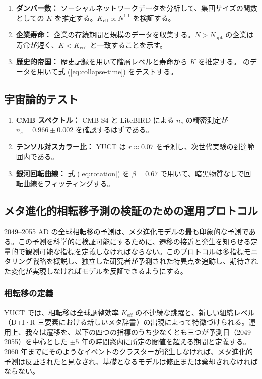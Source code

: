 \documentclass[12pt,a4paper]{article}
\newcommand{\Keff}{K_{\mathrm{eff}}}
\theoremstyle{remark}
\begin{document}
	\begin{enumerate}
		\item \textbf{ダンバー数：} ソーシャルネットワークデータを分析して、集団サイズの関数としての \(K\) を推定する。\(\Keff \propto N^{1.1}\) を検証する。
		\item \textbf{企業寿命：} 企業の存続期間と規模のデータを収集する。\(N > N_{\text{opt}}\) の企業は寿命が短く、\(K < K_{\text{crit}}\) と一致することを示す。
		\item \textbf{歴史的帝国：} 歴史記録を用いて階層レベルと寿命から \(K\) を推定する。\cite{TurchinNefedov2009} のデータを用いて式 (\ref{eq:collapse-time}) をテストする。
	\end{enumerate}
	
	\subsection{宇宙論的テスト}
	
	\begin{enumerate}
		\item \textbf{CMB スペクトル：} CMB-S4 と LiteBIRD による \(n_s\) の精密測定が \(n_s = 0.966 \pm 0.002\) を確認するはずである。
		\item \textbf{テンソル対スカラー比：} YUCT は \(r \approx 0.07\) を予測し、次世代実験の到達範囲内である。
		\item \textbf{銀河回転曲線：} 式 (\ref{eq:rotation}) を \(\beta = 0.67\) で用いて、暗黒物質なしで回転曲線をフィッティングする。
	\end{enumerate}
	
	\subsection{メタ進化的相転移予測の検証のための運用プロトコル}
	\label{subsec:forecast-protocol}
	
	2049–2055 AD の全球相転移の予測は、メタ進化モデルの最も印象的な予測である。この予測を科学的に検証可能にするために、遷移の接近と発生を知らせる定量的で観測可能な指標を定義しなければならない。このプロトコルは多指標モニタリング戦略を概説し、独立した研究者が予測された特異点を追跡し、期待された変化が実現しなければモデルを反証できるようにする。
	
	\subsubsection{相転移の定義}
	
	YUCT では、相転移は全球調整効率 \(K_{\text{eff}}\) の不連続な跳躍と、新しい組織レベル（D+I·R 三要素における新しいメタ辞書）の出現によって特徴づけられる。運用上、我々は遷移を、以下の四つの指標のうち少なくとも三つが予測日（2049–2055）を中心とした \(\pm 5\) 年の時間窓内に所定の閾値を超える期間と定義する。2060 年までにそのようなイベントのクラスターが発生しなければ、メタ進化的予測は反証されたと見なされ、基礎となるモデルは修正または棄却されなければならない。
	
\end{document}
